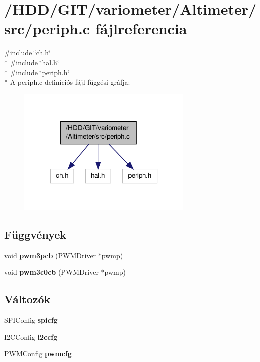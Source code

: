 \section{/\-H\-D\-D/\-G\-I\-T/variometer/\-Altimeter/src/periph.c fájlreferencia}
\label{periph_8c}
{\ttfamily \#include \char`\"{}ch.\-h\char`\"{}}\\*
{\ttfamily \#include \char`\"{}hal.\-h\char`\"{}}\\*
{\ttfamily \#include \char`\"{}periph.\-h\char`\"{}}\\*
A periph.\-c definíciós fájl függési gráfja\-:
\nopagebreak
\begin{figure}[H]
\begin{center}
\leavevmode
\includegraphics[width=238pt]{periph_8c__incl}
\end{center}
\end{figure}
\subsection*{Függvények}
\begin{DoxyCompactItemize}
\item 
void {\bf pwm3pcb} (P\-W\-M\-Driver $\ast$pwmp)
\item 
void {\bf pwm3c0cb} (P\-W\-M\-Driver $\ast$pwmp)
\end{DoxyCompactItemize}
\subsection*{Változók}
\begin{DoxyCompactItemize}
\item 
S\-P\-I\-Config {\bf spicfg}
\item 
I2\-C\-Config {\bf i2ccfg}
\item 
P\-W\-M\-Config {\bf pwmcfg}
\end{DoxyCompactItemize}


